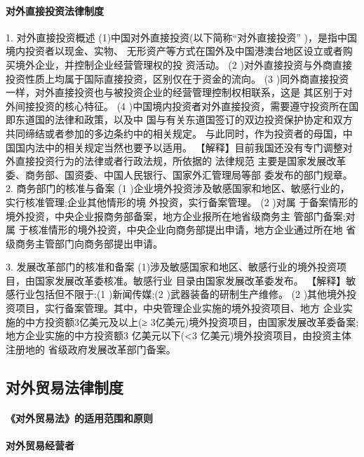 \documentclass[UTF8,12pt]{ctexart}
\numberwithin{equation}{section} %
\numberwithin{figure}{section}
\numberwithin{table}{section}
\begin{document}
	
	\paragraph{对外直接投资法律制度}
	  1. 对外直接投资概述
	  (1)中国对外直接投资(以下简称“对外直接投资” )，是指中国境内投资者以现金、实物、 无形资产等方式在国外及中国港澳台地区设立或者购买境外企业，并控制企业经营管理权的投 资活动。
	  (2 )对外直接投资与外商直接投资性质上均属于国际直接投资，区别仅在于资金的流向。 (3 )同外商直接投资 一样，对外直接投资也与被投资企业的经营管理控制权相联系，这是 其区别于对外间接投资的核心特征。
	  (4 )中国境内投资者对外直接投资，需要遵守投资所在国即东道国的法律和政策，以及中 国与有关东道国签订的双边投资保护协定和双方共同缔结或者参加的多边条约中的相关规定。 与此同时，作为投资者的母国，中国国内法中的相关规定当然也要予以适用。
	  【解释】目前我国还没有专门调整对外直接投资行为的法律或者行政法规，所依据的 法律规范 主要是国家发展改革委、商务部、国资委、中国人民银行、国家外汇管理局等部 委发布的部门规章。
	  2. 商务部门的核准与备案
	  (1 )企业境外投资涉及敏感国家和地区、敏感行业的，实行核准管理;企业其他情形的境 外投资，实行备案管理。
	  (2 )对属 于备案情形的境外投资，中央企业报商务部备案，地方企业报所在地省级商务主 管部门备案;对属 于核准情形的境外投资，中央企业向商务部提出申请，地方企业通过所在地 省级商务主管部门向商务部提出申请。
	  
	  
	  3. 发展改革部门的核准和备案 (1)涉及敏感国家和地区、敏感行业的境外投资项目，由国家发展改革委核准。敏感行业 目录由国家发展改革委发布。
	  【解释】敏感行业包括但不限于:(1 )新闻传媒;(2 )武器装备的研制生产维修。
	  (2 )其他境外投资项目，实行备案管理。其中，中央管理企业实施的境外投资项目、地方 企业实施的中方投资额3亿美元及以上(≥ 3亿美元)境外投资项目，由国家发展改革委备案; 地方企业实施的中方投资额3 亿美元以下(<3 亿美元)境外投资项目，由投资主体注册地的 省级政府发展改革部门备案。
	  
	 
	
	\subsection{对外贸易法律制度}
	\paragraph{《对外贸易法》的适用范围和原则}
	
	\paragraph{对外贸易经营者}
	
\end{document}
